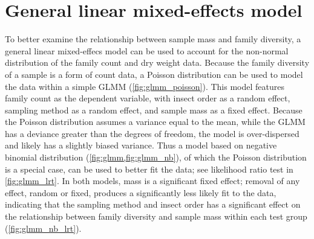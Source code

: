 \documentclass[10pt,letterpaper,twocolumn]{article}
\begin{document}
\section{General linear mixed-effects model}\label{sec:glmm}
To better examine the relationship between sample mass and family diversity, a general linear mixed-effecs model can be used to account for the non-normal distribution of the family count and dry weight data.
Because the family diversity of a sample is a form of count data, a Poisson distribution can be used to model the data within a simple GLMM (\cref{fig:glmm_poisson}).
This model features family count as the dependent variable, with insect order as a random effect, sampling method as a random effect, and sample mass as a fixed effect.
Because the Poisson distribution assumes a variance equal to the mean, while the GLMM has a deviance greater than the degrees of freedom, the model is over-dispersed and likely has a slightly biased variance.
Thus a model based on negative binomial distribution (\cref{fig:glmm,fig:glmm_nb}), of which the Poisson distribution is a special case, can be used to better fit the data; see likelihood ratio test in \cref{fig:glmm_lrt}.
In both models, mass is a significant fixed effect; removal of any effect, random or fixed, produces a significantly less likely fit to the data, indicating that the sampling method and insect order has a significant effect on the relationship between family diversity and sample mass within each test group (\cref{fig:glmm_nb_lrt}).
\end{document}
